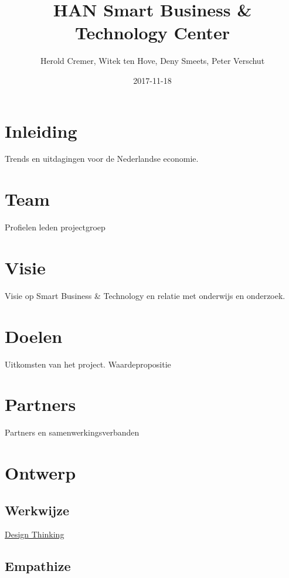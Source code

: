 \documentclass[]{book}
\title{HAN Smart Business \& Technology Center}
\author{Herold Cremer, Witek ten Hove, Deny Smeets, Peter Verschut}
\date{2017-11-18}
\begin{document}
\maketitle

{
\setcounter{tocdepth}{1}
\tableofcontents
}
\chapter{Inleiding}\label{inleiding}

Trends en uitdagingen voor de Nederlandse economie.

\chapter{Team}\label{team}

Profielen leden projectgroep

\chapter{Visie}\label{visie}

Visie op Smart Business \& Technology en relatie met onderwijs en
onderzoek.

\chapter{Doelen}\label{doelen}

Uitkomsten van het project. Waardepropositie

\chapter{Partners}\label{partners}

Partners en samenwerkingsverbanden

\chapter{Ontwerp}\label{ontwerp}

\section{Werkwijze}\label{werkwijze}

\href{https://dschool.stanford.edu/}{Design Thinking}

\section{Empathize}\label{empathize}
\end{document}
